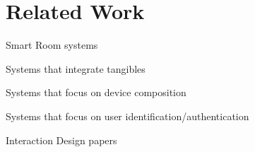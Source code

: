 \chapter{Related Work}

Smart Room systems

Systems that integrate tangibles

Systems that focus on device composition

Systems that focus on user identification/authentication

Interaction Design papers

